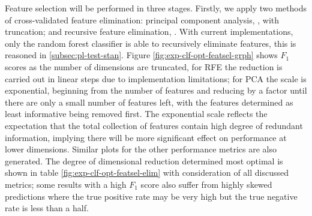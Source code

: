             Feature selection will be performed in three stages. Firstly, we apply two methods of cross-validated feature elimination: principal component analysis, , with truncation; and recursive feature elimination, . With current implementations, only the random forest classifier is able to recursively eliminate features, this is reasoned in \ref{subsec:pl-test-stan}. Figure \ref{fig:exp-clf-opt-featsel-grph} shows $F_{1}$ scores as the number of dimensions are truncated, for RFE the reduction is carried out in linear steps due to implementation limitations; for PCA the scale is exponential, beginning from the number of features and reducing by a factor until there are only a small number of features left, with the features determined as least informative being removed first. The exponential scale reflects the expectation that the total collection of features contain high degree of redundant information, implying there will be more significant effect on performance at lower dimensions. Similar plots for the other performance metrics are also generated. The degree of dimensional reduction determined most optimal is shown in table \ref{fig:exp-clf-opt-featsel-elim} with consideration of all discussed metrics; some results with a high $F_{1}$ score also suffer from highly skewed predictions where the true positive rate may be very high but the true negative rate is less than a half.
            
